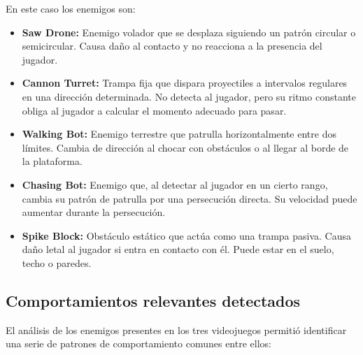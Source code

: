 En este caso los enemigos son:
\begin{itemize}
	\item \textbf{Saw Drone:} Enemigo volador que se desplaza siguiendo un patrón circular o semicircular. Causa daño al contacto y no reacciona a la presencia del jugador.
	\item \textbf{Cannon Turret:} Trampa fija que dispara proyectiles a intervalos regulares en una dirección determinada. No detecta al jugador, pero su ritmo constante obliga al jugador a calcular el momento adecuado para pasar.
	\item \textbf{Walking Bot:} Enemigo terrestre que patrulla horizontalmente entre dos límites. Cambia de dirección al chocar con obstáculos o al llegar al borde de la plataforma.
	\item \textbf{Chasing Bot:} Enemigo que, al detectar al jugador en un cierto rango, cambia su patrón de patrulla por una persecución directa. Su velocidad puede aumentar durante la persecución.
	\item \textbf{Spike Block:} Obstáculo estático que actúa como una trampa pasiva. Causa daño letal al jugador si entra en contacto con él. Puede estar en el suelo, techo o paredes.
\end{itemize}

\subsection{Comportamientos relevantes detectados}

El análisis de los enemigos presentes en los tres videojuegos permitió identificar una serie de patrones de comportamiento comunes entre ellos:

